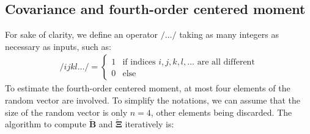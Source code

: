 \documentclass[12pt]{scrartcl}
\begin{document}
\subsection{Covariance and fourth-order centered moment}
For sake of clarity, we define an operator $/ \dots /$ taking as many integers as necessary as inputs, such as:
\begin{align}
/ ijkl \dots / =
\left\{ \begin{array}{rl}
1 & \text{if indices }i,j,k,l, \dots \text{ are all different} \\
0 & \text{else}
\end{array} \right.
\end{align}
To estimate the fourth-order centered moment, at most four elements of the random vector are involved. To simplify the notations, we can assume that the size of the random vector is only $n=4$, other elements being discarded. The algorithm to compute $\widetilde{\mathbf{B}}$ and $\widetilde{\boldsymbol{\Xi}}$ iteratively is:
\end{document}
